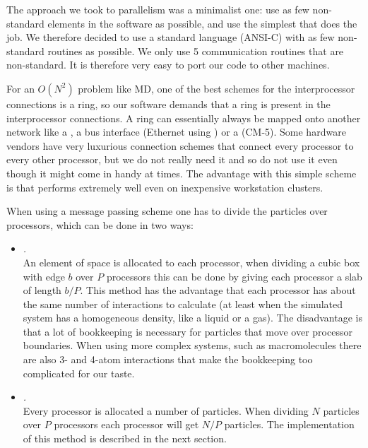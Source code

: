 {The approach we took to parallelism was a minimalist one: use as few
non-standard elements in the software as possible, and use the
simplest  that does the job. We therefore 
decided to use a standard language (ANSI-C) with as few non-standard
routines as possible. We only use 5 communication routines that are
non-standard. It is therefore very easy to port our code to other machines.

For an $O(N^2)$ problem like MD, one of the best schemes for the
interprocessor connections is a ring, so our software demands that a
ring is present in the interprocessor connections. A ring can essentially
always be mapped onto another network like a , a
bus interface (Ethernet {\eg} using 
 ) or 
a 
(CM-5). Some hardware vendors have very luxurious connection schemes
that connect every processor to every other processor, but we do not
really need it and so do not use it even though it might come in handy
at times. The advantage with this simple scheme is that {\gromacs}
performs extremely well even on inexpensive workstation clusters.

When using a message passing scheme one has to divide the particles 
over processors, which can be done in two ways:
\begin{itemize}
\item   {\em {}.}\\
        An element of space is allocated to each processor, when dividing
        a cubic box with edge $b$ over $P$ processors this can be done 
        by giving
        each processor a slab of length $b/P$. This method 
        has the advantage
        that each processor has about the same number of interactions
        to calculate (at least when the simulated system has a homogeneous
        density, like a liquid or a gas). The disadvantage is that a lot of
        bookkeeping is necessary for particles that move over processor
        boundaries. When using more complex systems, such as macromolecules there
        are also 3- and 4-atom interactions that make 
  	the bookkeeping too complicated for our taste.
\item   {\em {}.}\\
        Every processor is allocated a number of particles. When
        dividing $N$ particles over $P$ processors each processor will
        get $N/P$ particles. The implementation of this method
        is described in the next section.
\end{itemize}

}
